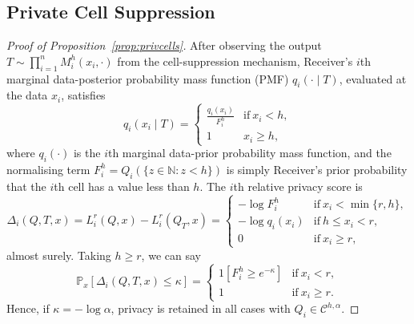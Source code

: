 \documentclass{article}
\theoremstyle{plain}
\theoremstyle{plain}
\theoremstyle{definition}
\theoremstyle{remark}
\theoremstyle{plain}
\renewcommand{\Pr}{\mathbb{P}}
\newcommand{\PrMx}{\Pr_{x}}
\begin{document}
\subsection{Private Cell Suppression} 
\begin{proof}[Proof of Proposition~\ref{prop:privcells}]
After observing the output $T\sim \prod_{i=1}^n M_i^h(x_i,\cdot)$ from the cell-suppression mechanism, Receiver's $i$th marginal data-posterior probability mass function (PMF) $q_i( \cdot \mid T)$, evaluated at the data $x_i$, satisfies 
    \begin{equation*}
        q_i(x_i\mid T) = 
        \begin{cases}
            \frac{q_i(x_i)}{F_{i}^{h}} &\text{if}~x_i<h,\\
            1 & x_i \geq h,
        \end{cases}
    \end{equation*}
     where $q_i(\cdot)$ is the $i$th marginal data-prior probability mass function, and the normalising term $F_{i}^{h} = Q_i(\{z\in \mathbb{N}:z < h\})$ is simply Receiver's prior probability that the $i$th cell has a value less than $h$.
    The $i$th relative privacy score is
    \begin{equation*}
        \Delta_i(Q,T,x) =  L_i^r(Q,x) - L_i^r(Q_T,x) = 
        \begin{cases}
     -\log F_{i}^{h} &\text{if}~ x_i < \min\{ r,h\}, \\
     -\log q_i(x_i) &\text{if}~ h \leq x_i < r, \\
     0 &\text{if}~ x_i \geq r,
    \end{cases}
    \end{equation*}
   almost surely. Taking $h \geq r$, we can say 
   \begin{equation*}
   \PrMx[\Delta_i(Q,T,x) \leq \kappa] =
    \begin{cases}
     1[F_{i}^{h} \geq e^{-\kappa}] &\text{if}~ x_i < r, \\
     1 &\text{if}~ x_i \geq r.
    \end{cases}
   \end{equation*}
   Hence, if $\kappa = -\log \alpha$, privacy is retained in all cases with $Q_i \in \mathcal{C}^{h,\alpha}$.
\end{proof}


\end{document}
